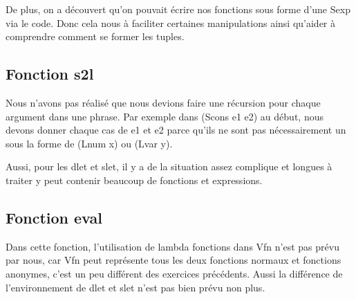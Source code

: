 \documentclass{article}
\begin{document}
De plus, on a découvert qu'on pouvait écrire nos fonctions sous forme d'une Sexp via le code. Donc cela nous à faciliter certaines manipulations ainsi qu'aider à comprendre comment se former les tuples.

\subsection{Fonction s2l}
Nous n'avons pas réalisé que nous devions faire une récursion pour chaque argument dans une phrase. Par exemple dans (Scons e1 e2) au début, nous devons donner chaque cas de e1 et e2 parce qu'ils ne sont pas nécessairement un sous la forme de (Lnum x) ou (Lvar y).

Aussi, pour les dlet et slet, il y a de la situation assez complique et longues à traiter y peut contenir beaucoup de fonctions et expressions.

\subsection{Fonction eval}
Dans cette fonction, l’utilisation de lambda fonctions dans Vfn n'est pas prévu par nous, car Vfn peut représente tous les deux fonctions normaux et fonctions anonymes, c'est un peu différent des exercices précédents. Aussi la différence de l'environnement de dlet et slet n'est pas bien prévu non plus.
\end{document}
